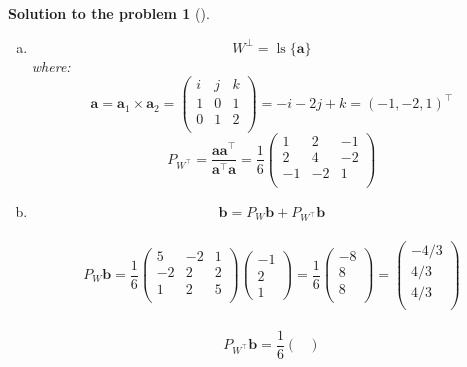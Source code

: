\documentclass[12pt,a4]{article}
\newtheorem{solution}{Solution to the problem}
\newcommand\ls{\operatorname{ls}}
\newcommand{\bR}{{\mathbb R}}
\newcommand{\ba}{{\mathbf a}}
\newcommand{\bb}{{\mathbf b}}
\begin{document}
\begin{solution}[]
\begin{enumerate}[(a)]
\[\begin{pmatrix}
-2 & 2 & 2 \\
\end{pmatrix}
= \frac{1}{6}
\begin{pmatrix}
5 & -2 & 1 \\
-2 & 2 & 2 \\
1 & 2 & 5 \\
\end{pmatrix}
\]
\item 
\[
W^\perp = \ls\{\ba\}
\]
where:
\[
\ba = \ba_1\times\ba_2 = 
\begin{pmatrix}
i & j & k \\
1 & 0 & 1\\
0 & 1 & 2 \\
\end{pmatrix} = -i -2j + k = (-1, -2, 1)^\top
\]
\[
P_{W^\top} = \frac{\ba\ba^\top}{\ba^\top\ba} = \frac{1}{6}\begin{pmatrix}
1 & 2 & -1 \\
2 & 4 & -2\\
-1 & -2 & 1 \\
\end{pmatrix} 
\]
\item
\[
\bb = P_W\bb + P_{W^\top}\bb
\] \\
\[
P_W\bb = \frac{1}{6}
\begin{pmatrix}
5 & -2 & 1 \\
-2 & 2 & 2 \\
1 & 2 & 5 \\
\end{pmatrix}
\begin{pmatrix}
-1 \\ 2 \\ 1
\end{pmatrix}
 = \frac{1}{6}
 \begin{pmatrix}
-8 \\ 
8 \\ 
8 \\ 
\end{pmatrix}
 =
 \begin{pmatrix}
-4/3 \\ 
 4/3 \\ 
 4/3 \\ 
\end{pmatrix}
\]\\
\[
P_{W^\top}\bb = \frac{1}{6}
\begin{pmatrix}

\end{pmatrix}\]
\end{enumerate}
\end{solution}
\end{document}
